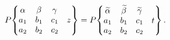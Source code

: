 \[\mathop{P\/}\nolimits\!\begin{Bmatrix}\alpha&\beta&\gamma&\\
a_{1}&b_{1}&c_{1}&z\\
a_{2}&b_{2}&c_{2}&\end{Bmatrix}=\mathop{P\/}\nolimits\!\begin{Bmatrix}%
\widetilde{\alpha}&\widetilde{\beta}&\widetilde{\gamma}&\\
a_{1}&b_{1}&c_{1}&t\\
a_{2}&b_{2}&c_{2}&\end{Bmatrix}.\]